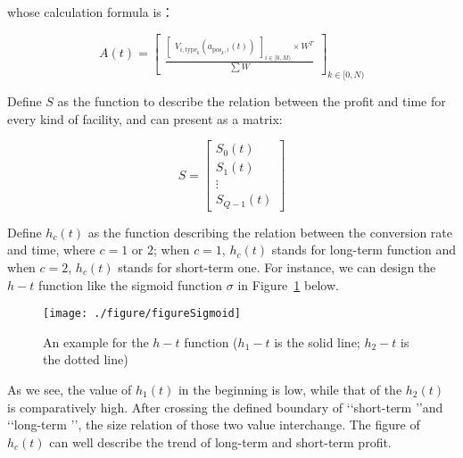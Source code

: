 \documentclass[./main.tex]{subfiles}
\begin{document}
        whose calculation formula is：

        \begin{equation}
            \label{eq:emc}
            A(t)=
            \begin{bmatrix}
                \frac{
                    \begin{bmatrix}
                        V_{i,\mathrm{type}_k}(a_{\mathrm{pos}_k,i}(t))
                    \end{bmatrix}_{i\in [0,M)}\times W^T}{\sum W}
            \end{bmatrix}_{k\in [0,N)}
        \end{equation}

        Define $S$ as the function to describe the relation between the profit and time for every kind of facility, and can present as a matrix:

        \begin{equation}
            \label{eq:fma}
            S=
            \begin{bmatrix}
                S_0(t)\\
                S_1(t)\\
                \vdots\\
                S_{Q-1}(t)
            \end{bmatrix}
        \end{equation}

        Define $h_c \left( t \right)$ as the function describing the relation between the conversion rate and time,
where $c = 1$ or $2$; when $c = 1$, $h_c \left( t \right)$ stands for long-term function and when $c = 2$, $h_c \left( t
\right)$ stands for short-term one.
        For instance, we can design the $h-t$ function like the sigmoid function $\sigma$ in Figure~\ref{fig:figureExample}
        below.

        \begin{figure}[H]
            \centering
            \texttt{[image: ./figure/figureSigmoid]}
            \caption{An example for the $h-t$ function ($h_1-t$ is the solid line; $h_2-t$ is the dotted line)}
            \label{fig:figureExample}
        \end{figure}

        As we see, the value of $h_1\left( t \right)$ in the beginning is low, while that of the $h_2\left( t \right)$ is comparatively high.
        After crossing the defined boundary of \lq\lq short-term \rq\rq and \lq\lq long-term \rq\rq, the size relation of those two value interchange.
        The figure of $h_c \left( t \right)$ can well describe the trend of long-term and short-term profit.
\end{document}
